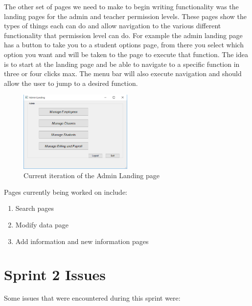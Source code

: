 \documentclass[11pt]{book}
\begin{document}
The other set of pages we need to make to begin writing functionality was the landing pages for the admin and teacher permission levels. These pages show the types of things each can do and allow navigation to the various different functionality that permission level can do. For example the admin landing page has a button to take you to a student options page, from there you select which option you want and will be taken to the page to execute that function. The idea is to start at the landing page and be able to navigate to a specific function in three or four clicks max. The menu bar will also execute navigation and should allow the user to jump to a desired function.

\begin{figure}
\caption{Current iteration of the Admin Landing page}
\centering
\includegraphics[width=0.5\textwidth]{admin_landing}
\end{figure}

Pages currently being worked on include:

\begin{enumerate}
\item Search pages
\item Modify data page
\item Add information and new information pages
\end{enumerate}


\section{Sprint 2 Issues}
Some issues that were encountered during this sprint were:
\end{document}
